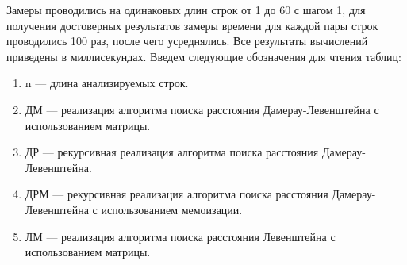 Замеры проводились на одинаковых длин строк от 1 до 60 с шагом 1, для получения достоверных результатов замеры 
времени для каждой пары строк проводились 100 раз, после чего усреднялись. Все результаты вычислений приведены в миллисекундах.
Введем следующие обозначения для чтения таблиц:
\begin{enumerate}
	\item n --- длина анализируемых строк.
	\item ДМ --- реализация алгоритма поиска расстояния Дамерау-Левенштейна с использованием матрицы.
	\item ДР --- рекурсивная реализация алгоритма поиска расстояния Дамерау-Левенштейна.
	\item ДРМ ---  рекурсивная реализация алгоритма поиска расстояния Дамерау-Левенштейна с использованием мемоизации.
	\item ЛМ --- реализация алгоритма поиска расстояния Левенштейна с использованием матрицы.
\end{enumerate}






